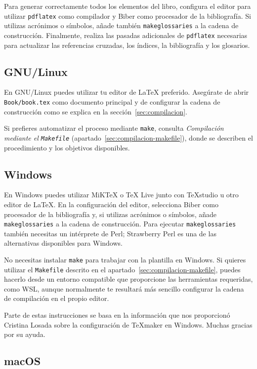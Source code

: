Para generar correctamente todos los elementos del libro, configura el editor para utilizar \texttt{pdflatex} como compilador y Biber como procesador de la bibliografía. Si utilizas acrónimos o símbolos, añade también \texttt{makeglossaries} a la cadena de construcción. Finalmente, realiza las pasadas adicionales de \texttt{pdflatex} necesarias para actualizar las referencias cruzadas, los índices, la bibliografía y los glosarios.

\subsection{GNU/Linux}

En GNU/Linux puedes utilizar tu editor de \LaTeX{} preferido. Asegúrate de abrir \texttt{Book/book.tex} como documento principal y de configurar la cadena de construcción como se explica en la sección~\ref{sec:compilacion}.

Si prefieres automatizar el proceso mediante \texttt{make}, consulta \textit{Compilación mediante el \texttt{Makefile}} (apartado~\ref{sec:compilacion-makefile}), donde se describen el procedimiento y los objetivos disponibles.

\subsection{Windows}

En Windows puedes utilizar MiKTeX o TeX Live junto con TeXstudio u otro editor de \LaTeX{}. En la configuración del editor, selecciona Biber como procesador de la bibliografía y, si utilizas acrónimos o símbolos, añade \texttt{makeglossaries} a la cadena de construcción. Para ejecutar \texttt{makeglossaries} también necesitas un intérprete de Perl; Strawberry Perl es una de las alternativas disponibles para Windows.

No necesitas instalar \texttt{make} para trabajar con la plantilla en Windows. Si quieres utilizar el \texttt{Makefile} descrito en el apartado~\ref{sec:compilacion-makefile}, puedes hacerlo desde un entorno compatible que proporcione las herramientas requeridas, como WSL, aunque normalmente te resultará más sencillo configurar la cadena de compilación en el propio editor.

Parte de estas instrucciones se basa en la información que nos proporcionó Cristina Losada sobre la configuración de TeXmaker en Windows. Muchas gracias por su ayuda.

\subsection{macOS}

